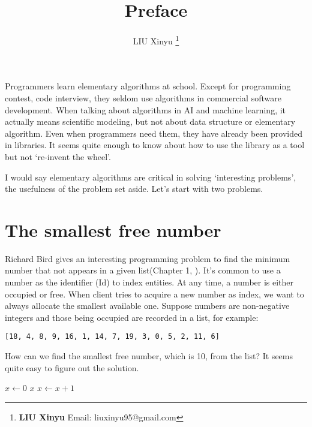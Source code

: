 \documentclass[b5paper]{article}
\begin{document}
\title{Preface}

\author{LIU Xinyu
\thanks{{\bfseries LIU Xinyu } \newline
  Email: liuxinyu95@gmail.com \newline}
  }

\maketitle
\fi


Programmers learn elementary algorithms at school. Except for programming contest, code interview, they seldom use algorithms in commercial software development. When talking about algorithms in AI and machine learning, it actually means scientific modeling, but not about data structure or elementary algorithm. Even when programmers need them, they have already been provided in libraries. It seems quite enough to know about how to use the library as a tool but not `re-invent the wheel'.

I would say elementary algorithms are critical in solving `interesting problems', the usefulness of the problem set aside. Let's start with two problems.

\section{The smallest free number}
\label{min-free} 

Richard Bird gives an interesting programming problem to find the minimum number that not appears in a given list(Chapter 1, \cite{Bird-book}). It's common to use a number as the identifier (Id) to index entities. At any time, a number is either occupied or free. When client tries to acquire a new number as index, we want to always allocate the smallest available one. Suppose numbers are non-negative integers and those being occupied are recorded in a list, for example:

\begin{verbatim}
[18, 4, 8, 9, 16, 1, 14, 7, 19, 3, 0, 5, 2, 11, 6]
\end{verbatim}

How can we find the smallest free number, which is 10, from the list? It seems quite easy to figure out the solution.

\begin{algorithmic}[1]
  \State $x \gets 0$
  \Loop
      \State \Return $x$
    \Else
      \State $x \gets x + 1$
    \EndIf
  \EndLoop
\EndFunction
\end{algorithmic}
\end{document}
